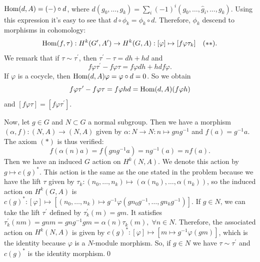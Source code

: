 $\text{Hom}(d,A)=(-)\circ d$, where $d(g_0,\dots, g_k)=\sum_i (-1)^i(g_0,\dots,\hat{g}_i,\dots,g_k)$. Using this expression 
it's easy to see that $d\circ\phi_k = \phi_k\circ d$. Therefore, $\phi_k$ descend to morphisms in cohomology:
\begin{equation}
    \text{Hom}(f,\tau): H^k(G^\prime,A^\prime)\rightarrow H^k(G,A):[\varphi]\mapsto [f\varphi\tau_k]\quad(**).
\end{equation}
We remark that if $\tau\sim\tau^\prime$, then $\tau^\prime-\tau=dh+hd$ and 
\begin{equation}
    f\varphi\tau^\prime -f\varphi\tau = f\varphi dh + hdf\varphi.
\end{equation}
If $\varphi$ is a cocycle, then $\text{Hom}(d,A)\varphi=\varphi\circ d=0$. So we obtain 
\begin{equation}
    f\varphi\tau^\prime -f\varphi\tau = f\varphi hd = \text{Hom}(d,A)(f\varphi h)
\end{equation}
and $[f\varphi\tau]=[f\varphi\tau^\prime]$.\par

Now, let $g\in G$ and $N\subset G$ a normal subgroup. Then we have a morphism $(\alpha,f):(N,A)\to (N,A)$
given by $\alpha:N\to N:n\mapsto gng^{-1}$ and $f(a)=g^{-1}a$. The axiom $(*)$ is thus verified:
\begin{equation}
   f(\alpha(n)a)=f(gng^{-1}a)=ng^{-1}(a)=nf(a).    
\end{equation}
Then we have an induced $G$ action on $H^k(N,A)$. We denote this action by $g\mapsto c(g)^*$.
This action is the same as the one stated in the problem because 
we have the lift $\tau$ given by $\tau_k:(n_0,\dots,n_k)\mapsto (\alpha(n_0),\dots,\alpha(n_k))$, so the induced action 
on $H^k(G,A)$ is $c(g)^*:[\varphi]\mapsto [(n_0,\dots,n_k)\mapsto g^{-1}\varphi(gn_0g^{-1},\dots, gn_kg^{-1})]$.
If $g\in N$, we can take the lift $\tau^\prime$ defined 
by $\tau_k^\prime(m)=gm$. It satisfies $\tau_k^\prime(nm)=gnm=gng^{-1}gm=\alpha(n)\tau_k(m),\;\forall n\in N$.
Therefore, the associated action on $H^k(N,A)$ is given by 
$c(g)^*:[\varphi]\mapsto [m\mapsto g^{-1}\varphi(gm)]$, 
which is the identity because $\varphi$ is a $N$-module morphism. 
So, if $g\in N$ we have $\tau\sim\tau^\prime$ and $c(g)^*$ is the identity morphism.\qed

